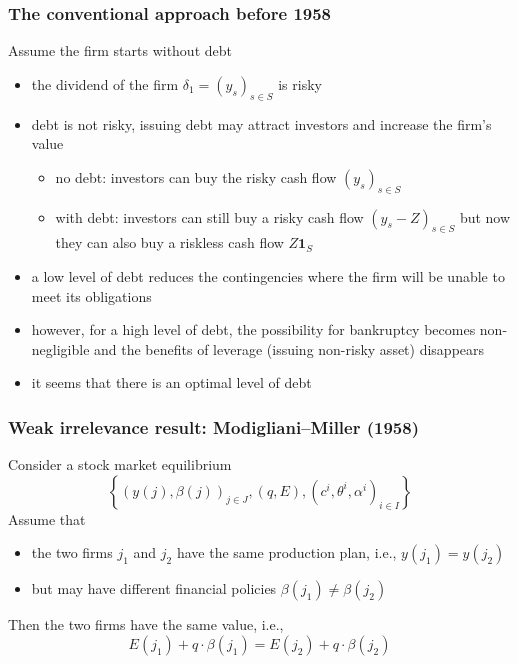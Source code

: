 \documentclass[blue]{beamer}
\def\1{\mathbf{1}}
\theoremstyle{definition}
\theoremstyle{example}
\begin{document}
\begin{frame}\frametitle{The conventional approach before 1958}

Assume the firm starts without debt
    \begin{itemize}
    \item the dividend of the firm $\delta_1= (y_s)_{s\in S}$  is risky
    \item debt is not risky, issuing debt may attract investors and increase the firm's value
        \begin{itemize}
        \item no debt: investors can buy the risky cash flow $(y_s)_{s\in S}$
        \item with debt: investors can still buy a risky cash flow $(y_s - Z)_{s\in S}$ but now they can also buy a riskless cash flow $Z \1_S$
        \end{itemize}
    \item a low level of debt reduces the contingencies where the firm will be unable to meet its obligations
    \item however, for a high level of debt, the possibility for bankruptcy becomes non-negligible and the benefits of leverage (issuing non-risky asset)
disappears
    \item it seems that there is an optimal level of debt
    \end{itemize}

\end{frame}



\begin{frame}\frametitle{Weak irrelevance result: Modigliani--Miller (1958)}

\begin{theorem}
Consider a stock market equilibrium
\[
\left\{ (y(j),\beta(j))_{j\in J}, (q,E), (c^i,\theta^i,\alpha^i)_{i\in I}\right\}
\]
Assume that
    \begin{itemize}
    \item the two firms $j_1$ and $j_2$ have the same production plan, i.e., $y(j_1)=y(j_2)$
    \item but may have different financial policies $\beta(j_1) \neq \beta(j_2)$
    \end{itemize}

Then the two firms have the same value, i.e.,
\[
E(j_1) + q\cdot \beta(j_1) = E(j_2) + q\cdot \beta(j_2)
\]
\end{theorem}

\end{frame}
\end{document}
